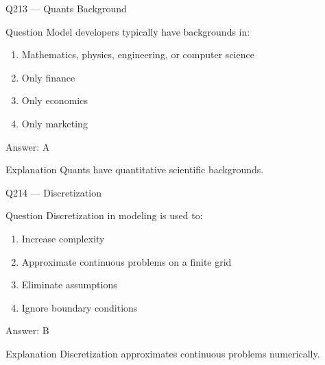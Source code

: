 \documentclass[aspectratio=169,8pt]{beamer}
\begin{document}
								\begin{frame}{Q213 --- Quants Background}
									\begin{block}{Question}
										Model developers typically have backgrounds in:
										\begin{enumerate}
											\item Mathematics, physics, engineering, or computer science
											\item Only finance
											\item Only economics
											\item Only marketing
										\end{enumerate}
									\end{block}
									\begin{exampleblock}{Answer: A}\end{exampleblock}
									\begin{block}{Explanation}
										Quants have quantitative scientific backgrounds.
									\end{block}
								\end{frame}
								
								\begin{frame}{Q214 --- Discretization}
									\begin{block}{Question}
										Discretization in modeling is used to:
										\begin{enumerate}
											\item Increase complexity
											\item Approximate continuous problems on a finite grid
											\item Eliminate assumptions
											\item Ignore boundary conditions
										\end{enumerate}
									\end{block}
									\begin{exampleblock}{Answer: B}\end{exampleblock}
									\begin{block}{Explanation}
										Discretization approximates continuous problems numerically.
									\end{block}
								\end{frame}
								
\end{document}
